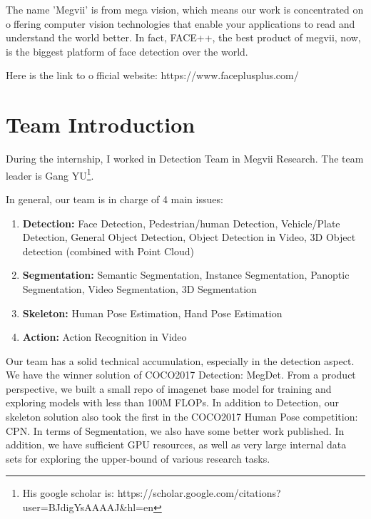 The name ’Megvii’ is from mega vision, which means our work is concentrated on offering computer vision technologies that enable your applications to read and
understand the world better.
In fact, FACE++, the best product of megvii, now, is the biggest platform of face detection over the world.

Here is the link to official website: https://www.faceplusplus.com/


\section{Team Introduction}
\label{sec:isauriam}

During the internship, I worked in Detection Team in Megvii Research.
The team leader is Gang YU\footnote{His google scholar is: https://scholar.google.com/citations?user=BJdigYsAAAAJ&hl=en}.

In general, our team is in charge of 4 main issues:
\begin{enumerate}
  \item{\textbf{Detection: }} Face Detection, Pedestrian/human Detection, Vehicle/Plate Detection, General Object Detection, Object Detection in Video, 3D Object detection (combined with Point Cloud)
  \item{\textbf{Segmentation: }} Semantic Segmentation, Instance Segmentation, Panoptic Segmentation, Video Segmentation, 3D Segmentation
  \item{\textbf{Skeleton: }} Human Pose Estimation, Hand Pose Estimation
  \item{\textbf{Action: }} Action Recognition in Video
\end{enumerate}

Our team has a solid technical accumulation, especially in the detection aspect. We have the winner solution of COCO2017 Detection:  MegDet\cite{peng2018megdet}.
From a product perspective, we built a small repo of imagenet base model for training and exploring models with less than 100M FLOPs.
In addition to Detection, our skeleton solution also took the first in the COCO2017 Human Pose competition: CPN\cite{chen2017cascaded}.
In terms of Segmentation, we also have some better work published. In addition, we have sufficient GPU resources, as well as very large internal data sets for exploring the upper-bound of various research tasks.





